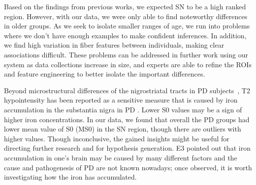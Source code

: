 Based on the findings from previous works, we expected SN to be a high ranked region. However, with our data, we were only able to find noteworthy differences in older groups. As we seek to isolate smaller ranges of age, we run into problems where we don't have enough examples to make confident inferences. In addition, we find high variation in fiber features between individuals, making clear associations difficult. These problems can be addressed in further work using our system as data collections increase in size, and experts are able to refine the ROIs and feature engineering to better isolate the important differences.



Beyond microstructural differences of the nigrostriatal tracts in PD subjects~\cite{zhang2015diffusion}, T2 hypointensity has been reported as a sensitive measure that is caused by iron accumulation in the substantia nigra in PD \cite{ollivier2018neuroimaging}. Lower S0 values may be a sign of higher iron concentrations.%
In our data, we found that overall the PD groups had lower mean value of S0 (MS0) in the SN region, though there are outliers with higher values. Though inconclusive, the gained insights might be useful for directing further research and for hypothesis generation. E3 pointed out that iron accumulation in one's brain may be caused by many different factors and the cause and pathogenesis of PD are not known nowadays; once observed, it is worth investigating how the iron has accumulated.

